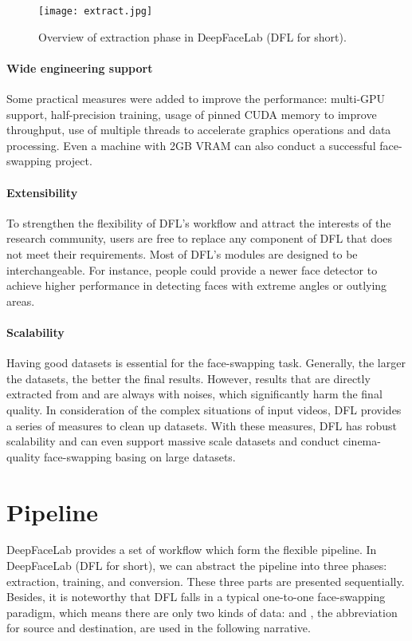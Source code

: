 \documentclass[10pt,twocolumn,letterpaper]{article}
\begin{document}
\begin{figure*}[h]
	\begin{center}
		\texttt{[image: extract.jpg]}
	\end{center}
	\caption{Overview of extraction phase in DeepFaceLab (DFL for short).}
	\label{fig:long2}
	\label{fig:onecol2}
\end{figure*}
\paragraph{Wide engineering support}
Some practical measures were added to improve the performance: multi-GPU support, half-precision training, usage of pinned CUDA memory to improve throughput, use of multiple threads to accelerate graphics operations and data processing. Even a machine with 2GB VRAM can also conduct a successful face-swapping project.

\paragraph{Extensibility} To strengthen the flexibility of DFL's workflow and attract the interests of the research community, users are free to replace any component of DFL that does not meet their requirements. Most of DFL's modules are designed to be interchangeable.
For instance, people could provide a newer face detector to achieve higher performance in detecting faces with extreme angles or outlying areas. 


\paragraph{Scalability} Having good datasets is essential for the face-swapping task. Generally, the larger the datasets, the better the final results. However, results that are directly extracted from  and  are always with noises, which significantly harm the final quality. In consideration of the complex situations of input videos, DFL provides a series of measures to clean up datasets. With these measures, DFL has robust scalability and can even support massive scale datasets and conduct cinema-quality face-swapping basing on large datasets.

\section{Pipeline}
\label{section:pipeline}
DeepFaceLab provides a set of workflow which form the flexible pipeline. In DeepFaceLab (DFL for short), we can abstract the pipeline into three phases: extraction, training, and conversion. These three parts are presented sequentially. Besides, it is noteworthy that DFL falls in a typical one-to-one face-swapping paradigm, which means there are only two kinds of data:  and , the abbreviation for source and destination, are used in the following narrative. 
\end{document}
